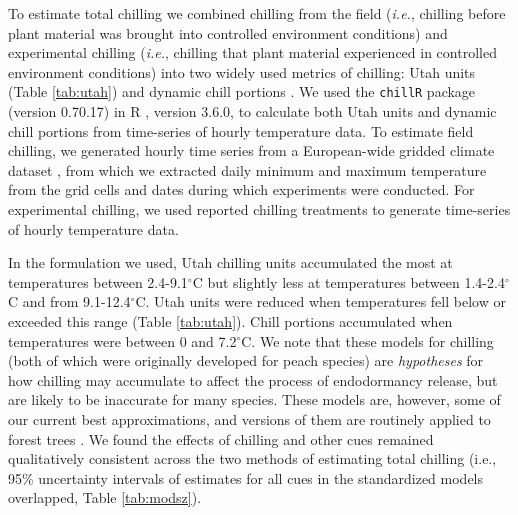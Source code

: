 \documentclass{article}
\begin{document}
\par To estimate total chilling we combined chilling from the field (\emph{i.e.}, chilling before plant material was brought into controlled environment conditions) and experimental chilling (\emph{i.e.}, chilling that plant material experienced in controlled environment conditions) into two widely used metrics of chilling: Utah units (Table \ref{tab:utah}) and dynamic chill portions \emph{\citep{dennis2003,Luedeling:2011qe}}. We used the \texttt{chillR} package (version 0.70.17) in R \emph{\citep{Rcore:2017, chillR2019}}, version 3.6.0, to calculate both Utah units and dynamic chill portions from time-series of hourly temperature data. To estimate field chilling, we generated hourly time series from a European-wide gridded climate dataset \emph{\citep{cornes2018}}, from which we extracted daily minimum and maximum temperature from the grid cells and dates during which experiments were conducted. For experimental chilling, we used reported chilling treatments to generate time-series of hourly temperature data.
\par In the formulation we used, Utah chilling units accumulated the most at temperatures between 2.4-9.1$^{\circ}$C but slightly less at temperatures between 1.4-2.4$^{\circ}$C and from 9.1-12.4$^{\circ}$C. Utah units were reduced when temperatures fell below or exceeded this range (Table \ref{tab:utah}). Chill portions accumulated when temperatures were between 0 and 7.2$^{\circ}$C. We note that these models for chilling (both of which were originally developed for peach species) are \emph{hypotheses} for how chilling may accumulate to affect the process of endodormancy release, but are likely to be inaccurate for many species. These models are, however, some of our current best approximations, and versions of them are routinely applied to forest trees \emph{\citep[e.g.,][]{Harrington:2010}}. We found the effects of chilling and other cues remained qualitatively consistent across the two methods of estimating total chilling (i.e., 95\% uncertainty intervals of estimates for all cues in the standardized models overlapped, Table \ref{tab:modsz}).
\end{document}
